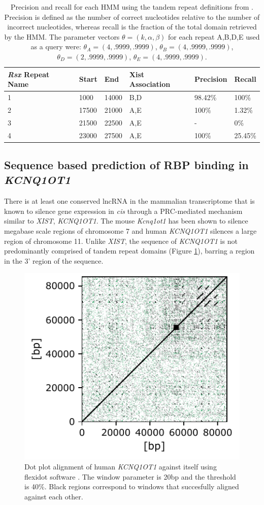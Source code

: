 \begin{table}[h!]
\centering
\begin{tabular}{|l|l|l|l|l|l|}
\hline 
\emph{Rsx} Repeat Name& Start & End   & Xist Association   & Precision& Recall                      \\
\hline 
    1&  1000   & 14000    & B,D     & 98.42\% & 100\% \\
      2&17500 & 21000  & A,E     & 100\%   & 1.32\% \\
      3&21500  & 22500   & A,E      & - & 0\%  \\
      4&23000 & 27500  & A,E     & 100\%   & 25.45\% \\
\hline 
\end{tabular}
\caption[\textit{Rsx-Xist} Precision and Recall]{Precision and recall for each HMM using the tandem repeat definitions from \cite{Sprague2019NonlinearDomains}. Precision is defined as the number of correct nucleotides relative to the number of incorrect nucleotides, whereas recall is the fraction of the total domain retrieved by the HMM. The parameter vectors $\theta = (k,\alpha,\beta)$ for each repeat A,B,D,E used as a query were: $\theta_A = (4,.9999,.9999)$, $\theta_B = (4,.9999,.9999)$, $\theta_D = (2,.9999,.9999)$, $\theta_E = (4,.9999,.9999)$.}
\label{tbl:rsxresults}
\end{table}


\subsection{Sequence based prediction of RBP binding in \textit{KCNQ1OT1}}

There is at least one conserved lncRNA in the mammalian transcriptome that is known to silence gene expression in \emph{cis} through a PRC-mediated mechanism similar to \emph{XIST}, \emph{KCNQ1OT1}. The mouse \emph{Kcnq1ot1} has been shown to silence megabase scale regions of chromosome 7 and human \emph{KCNQ1OT1} silences a large region of chromosome 11. Unlike \emph{XIST}, the sequence of \emph{KCNQ1OT1} is not predominantly comprised of tandem repeat domains (Figure \ref{fig:kcndot}), barring a region in the 3' region of the sequence. 

\begin{figure}[h!]
\centering
\includegraphics[width=.4\textwidth]{images/kcnd.pdf}
\caption[\emph{KCNQ1OT1} dot plot alignment]{Dot plot alignment of human \emph{KCNQ1OT1} against itself using flexidot software \cite{Seibt2018FlexiDot:Analyses}. The window parameter is 20bp and the threshold is 40\%. Black regions correspond to windows that succesfully aligned against each other. }
\label{fig:kcndot}
\end{figure}


